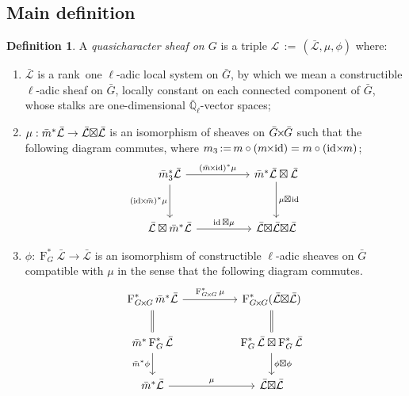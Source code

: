 \documentclass{amsart}
\makeatletter
\theoremstyle{plain}
\theoremstyle{definition}
\newtheorem{definition}[theorem]{Definition}
\theoremstyle{remark}
\newcommand{\EE}{\mathbb{\bar Q}_\ell}
\newcommand{\Frob}[1]{\operatorname{F}_{#1}}
\DeclareMathOperator{\id}{id}
\newcommand{\ceq}{{\, :=\, }}
\newcommand{\qcs}[1]{{\mathcal{#1}}}
\newcommand{\gqcs}[1]{{\mathcal{\bar #1}}}
\newcommand{\labitem}[2]{
\def\@itemlabel{\textbf{#1}}
\item
\def\@currentlabel{#1}\label{#2}}
\newcommand{\bm}{\bar{m}}
\newcommand{\bG}{\bar{G}}
\newcommand{\tight}[3]{\hspace{-#1pt}{#2}\hspace{-#3pt}}
\newcommand{\bGxG}{\text{$\bar{G} \tight{1}{\times}{1} \bar{G}$}}
\newcommand{\GxxG}{\text{$G \tight{1}{\times}{1} G$}}
\newcommand{\LxL}{\text{$\gqcs{L} \tight{0}{\boxtimes}{0} \gqcs{L}$}}
\makeatother
\begin{document}
\subsection{Main definition}\label{sec:category}

\begin{definition}\label{def:QC}
A \emph{quasicharacter sheaf on $G$} is a triple
$\qcs{L}\ceq (\gqcs{L},\mu,\phi)$ where:
\begin{enumerate}
\labitem{(QC.1)}{QC.1} $\gqcs{L}$ is a rank~one $\ell$-adic local system on $\bG$, by which we mean
a constructible $\ell$-adic sheaf on $\bG$, locally constant on each connected
component of $\bG$, whose stalks are one-dimensional $\EE$-vector spaces;
\labitem{(QC.2)}{QC.2} $\mu: \bm^* \gqcs{L} \to \LxL$ is an isomorphism of
sheaves on $\bGxG$ such that the following diagram commutes,
  where $m_3 \ceq m\circ (m\tight{1}{\times}{2}\id) = m\circ (\id\tight{2}{\times}{1} m)$;
  \[
  \begin{tikzcd}[row sep=30]
  \bm_3^*\gqcs{L} \arrow{rr}{(\bm \tight{1}{\times}{2} \id)^*\mu} \arrow[swap]{d}{(\id \tight{2}{\times}{1} \bm)^*\mu}
    &&  \bm^*\gqcs{L} \boxtimes \gqcs{L} \dar{\mu \tight{0}{\boxtimes}{1} \id} \\
    \gqcs{L} \boxtimes \bm^* \gqcs{L} \arrow{rr}{\id \boxtimes \mu}
    &&  \gqcs{L} \tight{0}{\boxtimes}{0} \LxL
  \end{tikzcd}
  \]
\labitem{(QC.3)}{QC.3} $\phi : \Frob{G}^* \gqcs{L} \to \gqcs{L}$ is an
  isomorphism of constructible $\ell$-adic sheaves on $\bG$ compatible with
  $\mu$ in the sense that the following diagram commutes.
  \[
  \begin{tikzcd}[row sep=20]
  \Frob{\GxxG}^* \bm^* \gqcs{L} \arrow{rr}{\Frob{\GxxG}^*\mu}
    && \Frob{\GxxG}^*(\LxL)\\
    \arrow[equal]{u} \bm^*  \Frob{G}^* \gqcs{L} \arrow[swap]{d}{\bm^* \phi}
    && \Frob{G}^*\gqcs{L}\boxtimes \Frob{G}^*\gqcs{L} \dar{\phi\boxtimes \phi} \arrow[equal]{u} \\
    \bm^*\gqcs{L} \arrow{rr}{\mu}
    && \LxL
  \end{tikzcd}
  \]
\end{enumerate}
\end{definition}
\end{document}
